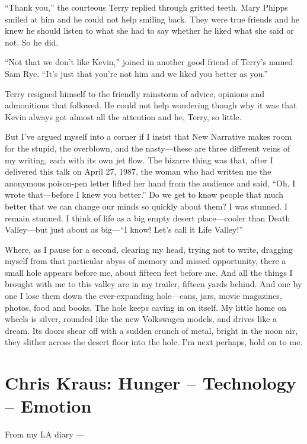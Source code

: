 \documentclass[
]{memoir}
\begin{document}
``Thank you,'' the courteous Terry replied through gritted teeth. Mary
Phipps smiled at him and he could not help smiling back. They were true
friends and he knew he should listen to what she had to say whether he
liked what she said or not. So he did.

``Not that we don't like Kevin,'' joined in another good friend of
Terry's named Sam Rye. ``It's just that you're not him and we liked you
better as you.''

Terry resigned himself to the friendly rainstorm of advice, opinions and
admonitions that followed. He could not help wondering though why it was
that Kevin always got almost all the attention and he, Terry, so little.

But I've argued myself into a corner if I insist that New Narrative
makes room for the stupid, the overblown, and the nasty---these are
three different veins of my writing, each with its own jet flow. The
bizarre thing was that, after I delivered this talk on April 27, 1987,
the woman who had written me the anonymous poison-pen letter lifted her
hand from the audience and said, ``Oh, I wrote that---before I knew you
better.'' Do we get to know people that much better that we can change
our minds so quickly about them? I was stunned. I remain stunned. I
think of life as a big empty desert place---cooler than Death
Valley---but just about as big---``I know! Let's call it Life Valley!''

Where, as I pause for a second, clearing my head, trying not to write,
dragging myself from that particular abyss of memory and missed
opportunity, there a small hole appears before me, about fifteen feet
before me. And all the things I brought with me to this valley are in my
trailer, fifteen yards behind. And one by one I lose them down the
ever-expanding hole---cans, jars, movie magazines, photos, food and
books. The hole keeps caving in on itself. My little home on wheels is
silver, rounded like the new Volkswagen models, and drives like a dream.
Its doors shear off with a sudden crunch of metal, bright in the noon
air, they slither across the desert floor into the hole. I'm next
perhaps, hold on to me.

\hypertarget{chris-kraus-hunger-technology-emotion}{%
\chapter{Chris Kraus: Hunger -- Technology --
Emotion}\label{chris-kraus-hunger-technology-emotion}}

From my LA diary ---
\end{document}
